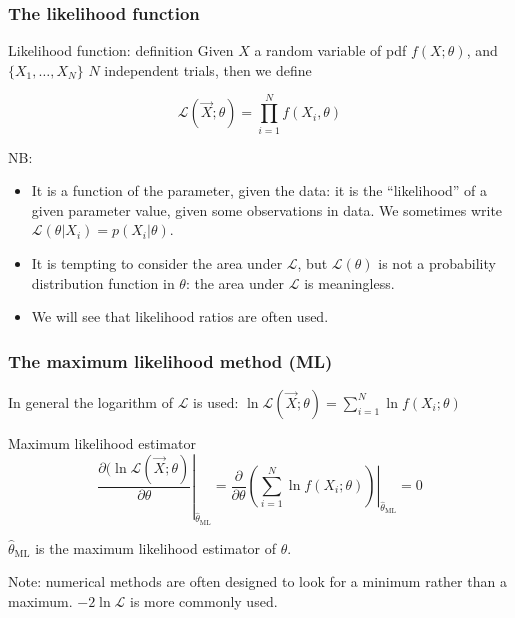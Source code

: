 \documentclass[9pt]{beamer}
\begin{document}
\begin{frame}
 \frametitle{The likelihood function}
 
 \begin{block}{Likelihood function: definition}
  Given $X$ a random variable of pdf $f(X;\theta)$, and $\{X_1,\dots,X_N\}$ $N$ independent trials, then we define
  
  $$\mathcal{L}\left(\vec{X};\theta\right) = \prod_{i=1}^N f(X_i,\theta)$$
 \end{block}
 
 NB:
 
 \begin{itemize}
  \item It is a function of the parameter, given the data: it is the ``likelihood'' of a given parameter value, given some observations in data. We sometimes write
  $\mathcal{L}(\theta | X_i) = p(X_i | \theta)$.
  \item It is tempting to consider the area under $\mathcal{L}$, but $\mathcal{L}(\theta)$ is not a probability distribution function in $\theta$: \alert{the area under $\mathcal{L}$ is meaningless}.
  \item We will see that likelihood ratios are often used.
 \end{itemize}


\end{frame}

\begin{frame}
 \frametitle{The maximum likelihood method (ML)}
 
 In general the logarithm of $\mathcal{L}$ is used: $\ln \mathcal{L}\left(\vec{X};\theta\right) = \sum_{i=1}^N \ln f(X_i;\theta)$
 
 \begin{block}{Maximum likelihood estimator}
  $$\left. \frac{\partial (\ln \mathcal{L} \left(\vec{X};\theta\right)}{\partial \theta}\right|_{\hat{\theta}_\text{ML}} = \left.\frac{\partial}{\partial \theta} \left(  \sum_{i=1}^N \ln f(X_i;\theta) \right)\right|_{\hat{\theta}_\text{ML}} = 0$$
  
  $\hat{\theta}_\text{ML}$ is the maximum likelihood estimator of $\theta$.
 \end{block}

 Note: numerical methods are often designed to look for a minimum rather than a maximum. $-2 \ln \mathcal{L}$ is more commonly used.
\end{frame}
\end{document}
